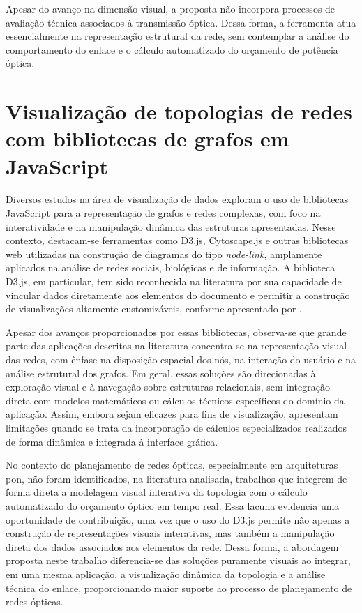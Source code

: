 Apesar do avanço na dimensão visual, a proposta não incorpora processos de avaliação técnica associados à transmissão óptica. Dessa forma, a ferramenta atua essencialmente na representação estrutural da rede, sem contemplar a análise do comportamento do enlace e o cálculo automatizado do orçamento de potência óptica.


\section{Visualização de topologias de redes com bibliotecas de grafos em JavaScript}

Diversos estudos na área de visualização de dados exploram o uso de bibliotecas JavaScript para a representação de grafos e redes complexas, com foco na interatividade e na manipulação dinâmica das estruturas apresentadas. Nesse contexto, destacam-se ferramentas como D3.js, Cytoscape.js e outras bibliotecas web utilizadas na construção de diagramas do tipo \textit{node-link}, amplamente aplicados na análise de redes sociais, biológicas e de informação. A biblioteca D3.js, em particular, tem sido reconhecida na literatura por sua capacidade de vincular dados diretamente aos elementos do documento e permitir a construção de visualizações altamente customizáveis, conforme apresentado por .

Apesar dos avanços proporcionados por essas bibliotecas, observa-se que grande parte das aplicações descritas na literatura concentra-se na representação visual das redes, com ênfase na disposição espacial dos nós, na interação do usuário e na análise estrutural dos grafos. Em geral, essas soluções são direcionadas à exploração visual e à navegação sobre estruturas relacionais, sem integração direta com modelos matemáticos ou cálculos técnicos específicos do domínio da aplicação. Assim, embora sejam eficazes para fins de visualização, apresentam limitações quando se trata da incorporação de cálculos especializados realizados de forma dinâmica e integrada à interface gráfica.

No contexto do planejamento de redes ópticas, especialmente em arquiteturas \gls{pon}, não foram identificados, na literatura analisada, trabalhos que integrem de forma direta a modelagem visual interativa da topologia com o cálculo automatizado do orçamento óptico em tempo real. Essa lacuna evidencia uma oportunidade de contribuição, uma vez que o uso do D3.js permite não apenas a construção de representações visuais interativas, mas também a manipulação direta dos dados associados aos elementos da rede. Dessa forma, a abordagem proposta neste trabalho diferencia-se das soluções puramente visuais ao integrar, em uma mesma aplicação, a visualização dinâmica da topologia e a análise técnica do enlace, proporcionando maior suporte ao processo de planejamento de redes ópticas.


